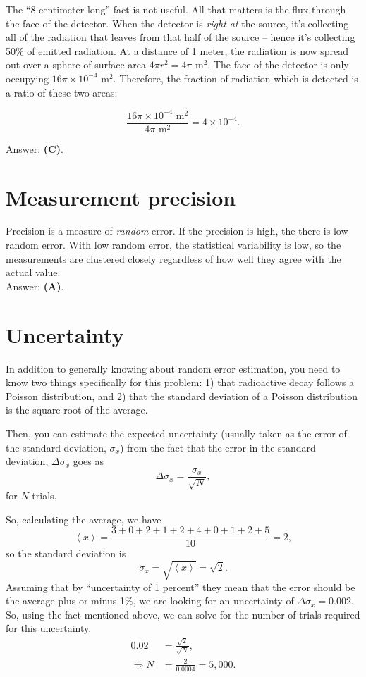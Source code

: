 \documentclass[11pt]{paper}
\newcommand{\answer}[1]{Answer: \textbf{(#1)}.}
\begin{document}
The ``8-centimeter-long'' fact is not useful.  All that matters is the flux through the face of the detector.  When the detector is \emph{right at} the source, it's collecting all of the radiation that leaves from that half of the source \--- hence it's collecting 50\% of emitted radiation.  At a distance of 1 meter, the radiation is now spread out over a sphere of surface area $4 \pi r^2 = 4 \pi \text{ m}^2$.  The face of the detector is only occupying $16 \pi \times 10^{-4} \text{ m}^2$.  Therefore, the fraction of radiation which is detected is a ratio of these two areas:

\begin{equation}
\frac{16 \pi \times 10^{-4} \text{ m}^2}{4 \pi \text{ m}^2} = 4 \times 10^{-4}.
\end{equation}

\answer{C}

\section{Measurement precision}

Precision is a measure of \emph{random} error.  If the precision is high, the there is low random error.  With low random error, the statistical variability is low, so the measurements are clustered closely regardless of how well they agree with the actual value.\\

\answer{A}

\section{Uncertainty}
In addition to generally knowing about random error estimation, you need to know two things specifically for this problem:  1) that radioactive decay follows a Poisson distribution, and 2) that the standard deviation of a Poisson distribution is the square root of the average.

Then, you can estimate the expected uncertainty (usually taken as the error of the standard deviation, $\sigma_x$) from the fact that the error in the standard deviation, $\Delta\sigma_x$ goes as 
\begin{equation}
\Delta\sigma_x = \frac{\sigma_x}{\sqrt{N}},
\end{equation}
for $N$ trials.

So, calculating the average, we have
\begin{equation}
\left<x\right> = \frac{3+0+2+1+2+4+0+1+2+5}{10} = 2,
\end{equation}
so the standard deviation is 
\begin{equation}
\sigma_x = \sqrt{\left<x\right>} = \sqrt{2}.
\end{equation}
Assuming that by ``uncertainty of 1 percent'' they mean that the error should be the average plus or minus 1\%, we are looking for an uncertainty of $\Delta\sigma_x = 0.002$.  So, using the fact mentioned above, we can solve for the number of trials required for this uncertainty.
\begin{align}
0.02 &= \frac{\sqrt{2}}{\sqrt{N}},\\
\Rightarrow N &= \frac{2}{0.0004} = 5,000.
\end{align}
\end{document}
